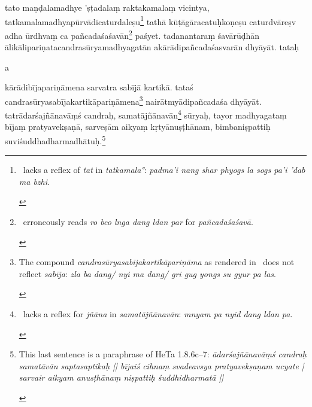 \documentclass[naipra.tex]{subfiles}
\begin{document}
\begin{sanskrit}
\pstart
tato maṇḍalamadhye 'ṣṭadalaṃ raktakamalaṃ vicintya, tatkamalamadhyapūrvādicaturdaleṣu\footnote{\begin{english}
	\TIB\ lacks a reflex of \emph{tat} in \emph{tatkamala°}: \emph{padma'i nang shar phyogs la sogs pa'i 'dab ma bzhi}.
\end{english}} tathā kūṭāgāracatuḥkoṇeṣu caturdvāreṣv adha ūrdhvaṃ ca pañcadaśaśavān\footnote{\begin{english}
	\TIB\ erroneously reads \emph{ro bco lnga dang ldan par} for \emph{pañcadaśaśavā}.
\end{english}} paśyet. 
tadanantaraṃ śavārūḍhān ālikālipariṇatacandrasūryamadhyagatān akārādipañcadaśasvarān dhyāyāt.
tataḥ \begin{mantra}a\end{mantra}\dsh kārādibījapariṇāmena sarvatra sabījā kartikā.
tataś candrasūryasabījakartikāpariṇāmena\footnote{\begin{english}
	The compound \emph{candrasūryasabījakartikāpariṇāma} as rendered in \TIB\ does not reflect \emph{sabīja}: \emph{zla ba dang/ nyi ma dang/ gri gug yongs su gyur pa las}.
\end{english}} nairātmyādipañcadaśa dhyāyāt. 
tatrādarśajñānavāṃś candraḥ, samatājñānavān\footnote{\begin{english}
	\TIB\ lacks a reflex for \emph{jñāna} in \emph{samatājñānavān}: \emph{mnyam pa nyid dang ldan pa}. 
\end{english}} sūryaḥ, tayor madhyagataṃ bījaṃ pratyavekṣaṇā, sarveṣām aikyaṃ kṛtyānuṣṭhānam, bimbaniṣpattiḥ suviśuddhadharmadhātuḥ.\footnote{\begin{english}
	This last sentence is a paraphrase of HeTa 1.8.6c–7: \emph{ādarśajñānavāṃś candraḥ samatāvān saptasaptikaḥ || bījaiś cihnaṃ svadeavsya pratyavekṣaṇam ucyate | sarvair aikyam anusṭhānaṃ niṣpattiḥ śuddhidharmatā ||} 
\end{english}}
\pend





\end{sanskrit}
\end{document}
